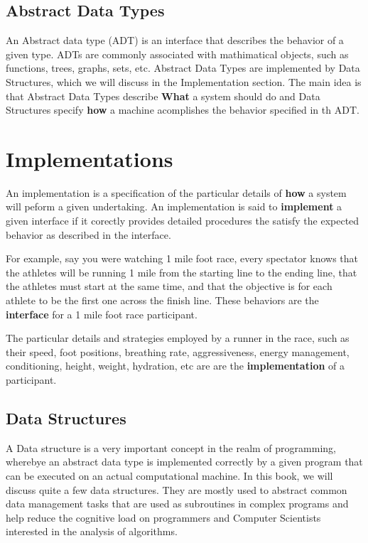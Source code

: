 \documentclass[12pt, letterpaper]{book}
\begin{document}
	\subsection{Abstract Data Types}

		An Abstract data type (ADT) is an interface that describes the behavior of a given type. ADTs are commonly associated with mathimatical objects, such as functions, trees, graphs, sets, etc. Abstract Data Types are implemented by Data Structures, which we will discuss in the Implementation section. The main idea is that Abstract Data Types describe \textbf{What} a system should do and Data Structures specify \textbf{how} a machine acomplishes the behavior specified in th ADT.

	\section{Implementations}

	An implementation is a specification of the particular details of \textbf{how} a system will peform a given undertaking. An implementation is said to \textbf{implement} a given interface if it corectly provides detailed procedures the satisfy the expected behavior as described in the interface. 

For example, say you were watching 1 mile foot race, every spectator knows that the athletes will be running 1 mile from the starting line to the ending line, that the athletes must start at the same time, and that the objective is for each athlete to be the first one across the finish line. These behaviors are the \textbf{interface} for a 1 mile foot race participant.

The particular details and strategies employed by a runner in the race, such as their speed, foot positions, breathing rate, aggressiveness, energy management, conditioning, height, weight, hydration, etc are are the \textbf{implementation} of a participant.

	\subsection{Data Structures}

	A Data structure is a very important concept in the realm of programming, wherebye an abstract data type is implemented correctly by a given program that can be executed on an actual computational machine. In this book, we will discuss quite a few data structures. They are mostly used to abstract common data management tasks that are used as subroutines in complex programs and help reduce the cognitive load on programmers and Computer Scientists interested in the analysis of algorithms.
\end{document}
